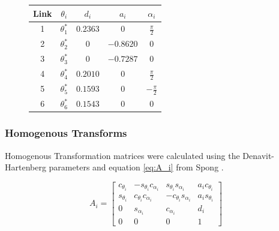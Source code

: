 \documentclass[journal]{new-aiaa}
\begin{document}
\begin{figure}[H]
\begin{minipage}{0.45\textwidth}
    \end{minipage}
    \hfill
    \begin{minipage}{0.45\textwidth}
        \centering
        \begin{tabular}{|c|c|c|c|c|}
          \hline
          Link & \(\theta_i\) & \(d_i\) & \(a_i\) & \(\alpha_i\) \\
          \hline
          1 & $\theta_1^*$ & $0.2363$ & 0         & $\frac{\pi}{2}$ \\
          2 & $\theta_2^*$ &      $0$ & $-0.8620$ & 0 \\
          3 & $\theta_3^*$ &      $0$ & $-0.7287$ & 0 \\
          4 & $\theta_4^*$ & $0.2010$ & 0         & $\frac{\pi}{2}$ \\
          5 & $\theta_5^*$ & $0.1593$ & 0         & $-\frac{\pi}{2}$ \\
          6 & $\theta_6^*$ & $0.1543$ & 0         & 0 \\
          \hline
        \end{tabular}
        \label{tab:DH Table}
    \end{minipage}
\end{figure}

\subsubsection{Homogenous Transforms}\label{sec:Equations of Motion:DH:Homogenous Transforms}

Homogenous Transformation matrices were calculated using the Denavit-Hartenberg parameters and equation \ref{eq:A_i} from Spong \cite{spong2020robot}.

\begin{equation}\label{eq:A_i}
    A_i = \begin{bmatrix}
        c_{\theta_i} & -s_{\theta_i}c_{\alpha_i} & s_{\theta_i}s_{\alpha_i} & a_ic_{\theta_i} \\
        s_{\theta_i} & c_{\theta_i}c_{\alpha_i}  & -c_{\theta_i}s_{\alpha_i} & a_is_{\theta_i} \\
        0              & s_{\alpha_i}                & c_{\alpha_i}                & d_i \\
        0              & 0                             & 0                             & 1
    \end{bmatrix}
\end{equation}
\end{document}
